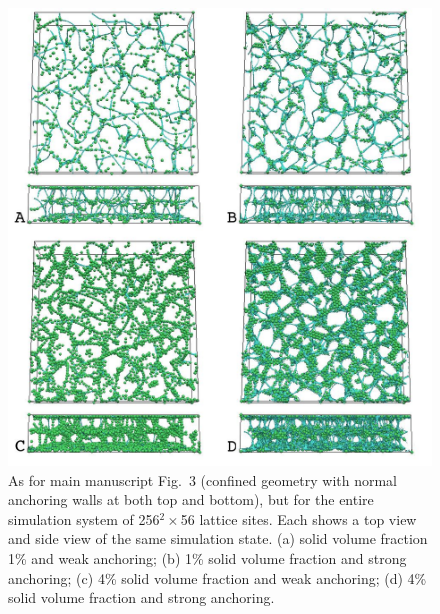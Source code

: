 \documentclass[12pt,twoside]{article}
\begin{document}
\begin{figure}
\begin{center}
\includegraphics[scale=0.42]{s3.jpg}
\end{center}
\caption{As for main manuscript Fig.~3 (confined geometry with normal
anchoring walls at both top and bottom), but for the entire simulation
system of 256$^2\times$56 lattice sites. Each shows a top view and
side view of the same simulation state. (a) solid volume fraction 1\%
and weak anchoring; (b) 1\% solid volume fraction and strong anchoring;
(c) 4\% solid volume fraction and weak anchoring; (d) 4\% solid
volume fraction and strong anchoring.}
\end{figure}
\end{document}
